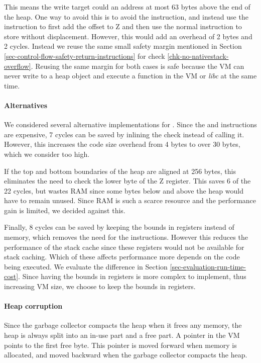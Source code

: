 This means the write target could an address at most 63 bytes above the end of the heap. One way to avoid this is to avoid the  instruction, and instead use the  instruction to first add the offset to Z and then use the normal  instruction to store without displacement. However, this would add an overhead of 2 bytes and 2 cycles. Instead we reuse the same small safety margin mentioned in Section \ref{sec-control-flow-safety-return-instructions} for check \ref{chk-no-nativestack-overflow}. Reusing the same margin for both cases is safe because the VM can never write to a heap object and execute a function in the VM or \emph{libc} at the same time.

\paragraph{Alternatives}
We considered several alternative implementations for . Since the  and  instructions are expensive, 7 cycles can be saved by inlining the check instead of calling it. However, this increases the code size overhead from 4 bytes to over 30 bytes, which we consider too high.

If the top and bottom boundaries of the heap are aligned at 256 bytes, this eliminates the need to check the lower byte of the Z register. This saves 6 of the 22 cycles, but wastes RAM since some bytes below and above the heap would have to remain unused. Since RAM is such a scarce resource and the performance gain is limited, we decided against this.

Finally, 8 cycles can be saved by keeping the bounds in registers instead of memory, which removes the need for the  instructions. However this reduces the performance of the stack cache since these registers would not be available for stack caching. Which of these affects performance more depends on the code being executed. We evaluate the difference in Section \ref{sec-evaluation-run-time-cost}. Since having the bounds in registers is more complex to implement, thus increasing VM size, we choose to keep the bounds in registers.

\paragraph{Heap corruption}
Since the garbage collector compacts the heap when it frees any memory, the heap is always split into an in-use part and a free part. A pointer in the VM points to the first free byte. This pointer is moved forward when memory is allocated, and moved backward when the garbage collector compacts the heap.

